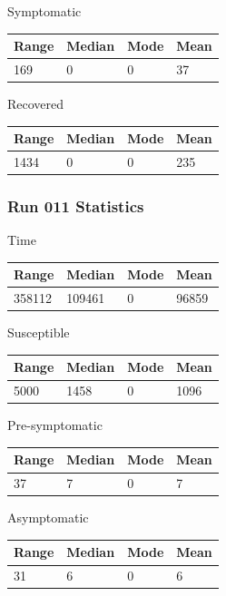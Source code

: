\documentclass{article}
\begin{document}
Symptomatic
\newline
\begin{tabular}{| l | l | l | l |}
  \hline\hline
  Range & Median & Mode & Mean \\
  \hline
  169 & 0 & 0 & 37 \\
  \hline
\end{tabular} 

Recovered
\newline
\begin{tabular}{| l | l | l | l |}
  \hline\hline
  Range & Median & Mode & Mean \\
  \hline
  1434 & 0 & 0 & 235 \\
  \hline
\end{tabular} 

\subsubsection{Run 011 Statistics}
Time
\newline
\begin{tabular}{| l | l | l | l |}
  \hline\hline
  Range & Median & Mode & Mean \\
  \hline
  358112 & 109461 & 0 & 96859 \\
  \hline
\end{tabular} 

Susceptible
\newline
\begin{tabular}{| l | l | l | l |}
  \hline\hline
  Range & Median & Mode & Mean \\
  \hline
  5000 & 1458 & 0 & 1096 \\
  \hline
\end{tabular} 

Pre-symptomatic
\newline
\begin{tabular}{| l | l | l | l |}
  \hline\hline
  Range & Median & Mode & Mean \\
  \hline
  37 & 7 & 0 & 7 \\
  \hline
\end{tabular} 

Asymptomatic
\newline
\begin{tabular}{| l | l | l | l |}
  \hline\hline
  Range & Median & Mode & Mean \\
  \hline
  31 & 6 & 0 & 6 \\
  \hline
\end{tabular} 
\end{document}
